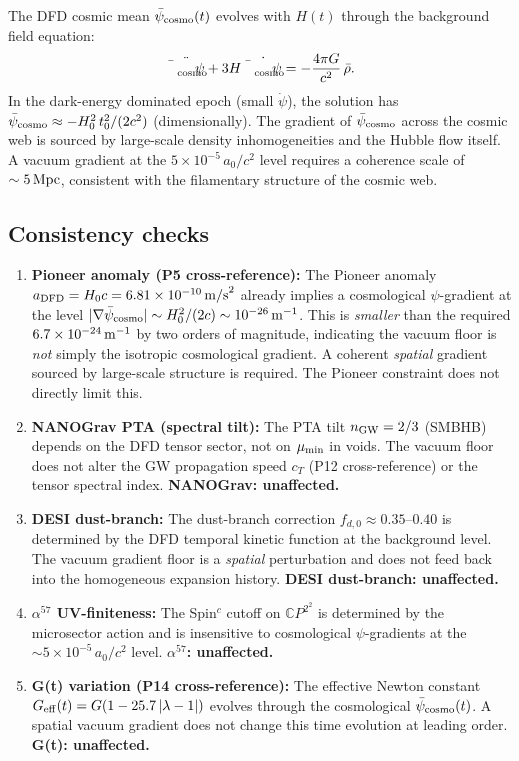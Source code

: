 \documentclass[11pt]{article}
\newcommand{\ee}[1]{\times 10^{#1}}
\newcommand{\CP}{\mathbb{C}P^2}
\newcommand{\lambdaone}{|\lambda-1|}
\newcommand{\DFD}{{\rm DFD}}
\newcommand{\mumin}{\mu_{\rm min}}
\newcommand{\psibar}{\bar{\psi}_{\rm cosmo}}
\begin{document}
The DFD cosmic mean $\psibar(t)$ evolves with $H(t)$ through the
background field equation:
\begin{equation}
  \ddot{\psibar} + 3H\dot{\psibar} = -\frac{4\pi G}{c^2}\,\bar\rho.
\end{equation}
In the dark-energy dominated epoch (small $\dot\psi$), the solution
has $\psibar \approx -H_0^2\,t_0^2/(2c^2)$ (dimensionally).  The
gradient of $\psibar$ across the cosmic web is sourced by large-scale
density inhomogeneities and the Hubble flow itself.  A vacuum gradient
at the $5\ee{-5}\,a_0/c^2$ level requires a coherence scale of $\sim
5\,{\rm Mpc}$, consistent with the filamentary structure of the cosmic web.

\subsection{Consistency checks}

\begin{enumerate}[label=(\alph*)]
  \item \textbf{Pioneer anomaly (P5 cross-reference):}
    The Pioneer anomaly $a_{\DFD} = H_0 c = 6.81\ee{-10}\,{\rm m/s}^2$
    already implies a cosmological $\psi$-gradient at the level
    $|\nabla\psibar| \sim H_0^2/(2c) \sim 10^{-26}\,{\rm m}^{-1}$.
    This is \emph{smaller} than the required $6.7\ee{-24}\,{\rm m}^{-1}$
    by two orders of magnitude, indicating the vacuum floor is \emph{not}
    simply the isotropic cosmological gradient. A coherent \emph{spatial}
    gradient sourced by large-scale structure is required.  The Pioneer
    constraint does not directly limit this.

  \item \textbf{NANOGrav PTA (spectral tilt):}
    The PTA tilt $n_{\rm GW} = 2/3$ (SMBHB) depends on the DFD tensor
    sector, not on $\mumin$ in voids.  The vacuum floor does not alter
    the GW propagation speed $c_T$ (P12 cross-reference) or the tensor
    spectral index.  \textbf{NANOGrav: unaffected.}

  \item \textbf{DESI dust-branch:}
    The dust-branch correction $f_{d,0} \approx 0.35$--$0.40$ is determined
    by the DFD temporal kinetic function at the background level.  The
    vacuum gradient floor is a \emph{spatial} perturbation and does not
    feed back into the homogeneous expansion history.
    \textbf{DESI dust-branch: unaffected.}

  \item \textbf{$\alpha^{57}$ UV-finiteness:}
    The Spin$^c$ cutoff on $\CP^2$ is determined by the microsector action
    and is insensitive to cosmological $\psi$-gradients at the $\sim
    5\ee{-5}\,a_0/c^2$ level.  \textbf{$\alpha^{57}$: unaffected.}

  \item \textbf{G(t) variation (P14 cross-reference):}
    The effective Newton constant $G_{\rm eff}(t) = G(1 - 25.7\,\lambdaone)$
    evolves through the cosmological $\psibar(t)$.  A spatial vacuum gradient
    does not change this time evolution at leading order.
    \textbf{G(t): unaffected.}
\end{enumerate}
\end{document}
